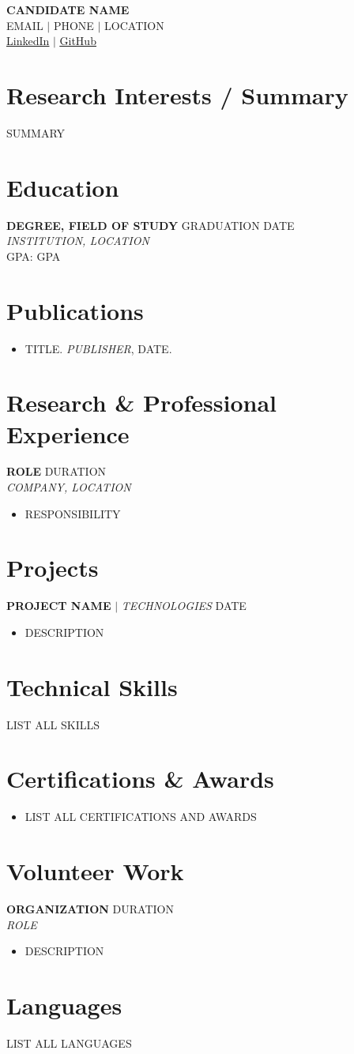 \documentclass[letterpaper,11pt]{article}
\newcommand{\resumeItem}[1]{\item\small{#1\vspace{-2pt}}}
\newcommand{\resumeItemListStart}{\begin{itemize}[leftmargin=*,topsep=2pt]}
\newcommand{\resumeItemListEnd}{\end{itemize}\vspace{-4pt}}
\begin{document}
\begin{center}
  {\LARGE\bfseries CANDIDATE NAME} \\ \vspace{4pt}
  \small EMAIL $|$ PHONE $|$ LOCATION \\ \vspace{2pt}
  \small \href{LINKEDIN}{\underline{LinkedIn}} $|$ \href{GITHUB}{\underline{GitHub}}
\end{center}

\section{Research Interests / Summary}
SUMMARY

\section{Education}
\textbf{DEGREE, FIELD OF STUDY} \hfill GRADUATION DATE \\
\textit{INSTITUTION, LOCATION} \\
GPA: GPA

\section{Publications}
\resumeItemListStart
  \resumeItem{TITLE. \textit{PUBLISHER}, DATE.}
\resumeItemListEnd

\section{Research \& Professional Experience}
\textbf{ROLE} \hfill DURATION \\
\textit{COMPANY, LOCATION}
\resumeItemListStart
  \resumeItem{RESPONSIBILITY}
\resumeItemListEnd

\section{Projects}
\textbf{PROJECT NAME} $|$ \textit{TECHNOLOGIES} \hfill DATE
\resumeItemListStart
  \resumeItem{DESCRIPTION}
\resumeItemListEnd

\section{Technical Skills}
\small LIST ALL SKILLS

\section{Certifications \& Awards}
\resumeItemListStart
  \resumeItem{LIST ALL CERTIFICATIONS AND AWARDS}
\resumeItemListEnd

\section{Volunteer Work}
\textbf{ORGANIZATION} \hfill DURATION \\
\textit{ROLE}
\resumeItemListStart
  \resumeItem{DESCRIPTION}
\resumeItemListEnd

\section{Languages}
\small LIST ALL LANGUAGES
\end{document}
